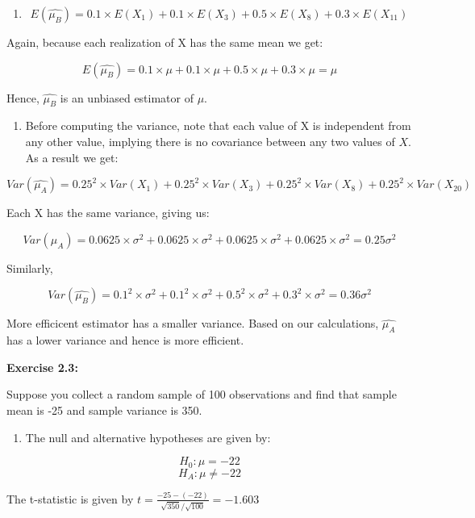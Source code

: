 \documentclass[
]{book}
\providecommand{\tightlist}{%
  \setlength{\itemsep}{0pt}\setlength{\parskip}{0pt}}
\theoremstyle{definition}
\theoremstyle{definition}
\theoremstyle{definition}
\theoremstyle{definition}
\theoremstyle{remark}
\begin{document}
\begin{enumerate}
\def\labelenumi{\alph{enumi}.}
\setcounter{enumi}{1}
\tightlist
\item
  \[E(\widehat{\mu_B})=0.1\times E(X_1)+0.1\times E(X_3)+ 0.5 \times E(X_8)+0.3 \times E(X_{11})\]
\end{enumerate}

Again, because each realization of X has the same mean we get:

\[E(\widehat{\mu_B})=0.1\times \mu+0.1\times \mu+ 0.5 \times \mu+0.3 \times \mu=\mu\]

Hence, \(\widehat{\mu_B}\) is an unbiased estimator of \(\mu\).

\begin{enumerate}
\def\labelenumi{\alph{enumi}.}
\setcounter{enumi}{2}
\tightlist
\item
  Before computing the variance, note that each value of X is independent from any other value, implying there is no covariance between any two values of \(X\). As a result we get:
\end{enumerate}

\[Var(\widehat{\mu_A})=0.25^2\times Var(X_1) +0.25^2\times Var(X_3)+ 0.25^2 \times Var(X_8) + 0.25^2 \times Var(X_{20})\]

Each X has the same variance, giving us:

\[Var(\widehat{\mu_A})=0.0625 \times \sigma^2 +0.0625\times \sigma^2+ 0.0625 \times \sigma^2 + 0.0625 \times \sigma^2=0.25 \sigma^2\]

Similarly,

\[Var(\widehat{\mu_B})=0.1^2 \times \sigma^2+0.1^2\times \sigma^2+ 0.5^2 \times \sigma^2+0.3^2 \times \sigma^2=0.36\sigma^2\]

More efficicent estimator has a smaller variance. Based on our calculations, \(\widehat{\mu_A}\) has a lower variance and hence is more efficient.

\textbf{Exercise 2.3:}

Suppose you collect a random sample of 100 observations and find that sample mean is -25 and sample variance is 350.

\begin{enumerate}
\def\labelenumi{\alph{enumi}.}
\tightlist
\item
  The null and alternative hypotheses are given by:
\end{enumerate}

\[H_0: \mu=-22\]
\[H_A: \mu\neq-22\]

The t-statistic is given by \(\displaystyle t=\frac{-25-(-22)}{\sqrt{350}/\sqrt{100}}=-1.603\)
\end{document}
